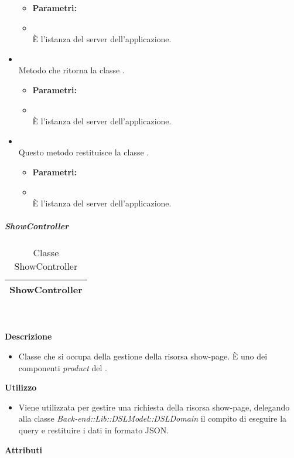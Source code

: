 \begin{itemize}
						\begin{itemize}\addtolength{\itemsep}{-0.5\baselineskip}
						\item[] \textbf{Parametri:}
						\item[]  \\ È l'istanza del server dell'applicazione.	
				\end{itemize}
					\item[] \textbf{} \\ Metodo che ritorna la classe .
						\begin{itemize}\addtolength{\itemsep}{-0.5\baselineskip}
						\item[] \textbf{Parametri:}
						\item[]  \\ È l'istanza del server dell'applicazione.	
				\end{itemize}
					\item[] \textbf{} \\ Questo metodo restituisce la classe .
						\begin{itemize}\addtolength{\itemsep}{-0.5\baselineskip}
						\item[] \textbf{Parametri:}
						\item[]  \\ È l'istanza del server dell'applicazione.	
				\end{itemize}
		\end{itemize}
			\subparagraph{ShowController} 
\begin{table}[ht]
\begin{center}
\bgroup
	\setlength{\arrayrulewidth}{0.6mm}
	\def\arraystretch{1}
		\begin{tabular}{ | p{12cm} | }
				\hline  
					\centerline{\textbf{ShowController}}
		\\ \hline 
				\hline
				\hline
		
		\end{tabular}
\egroup
\caption{Classe ShowController}
\end{center}
\end{table}  \textbf{\\ \\ Descrizione} 
					\begin{itemize}
						\item[] Classe che si occupa della gestione della risorsa show-page. È uno dei componenti \textit{product} del  .
					\end{itemize}      
				\textbf{Utilizzo}  
					\begin{itemize}
						\item[] Viene utilizzata per gestire una richiesta della risorsa show-page, delegando alla classe \textit{Back-end::Lib::DSLModel::DSLDomain} il compito di eseguire la query e restituire i dati in formato JSON.
					\end{itemize}
			 \textbf{Attributi} 
	\begin{itemize}
		\end{itemize}
		
